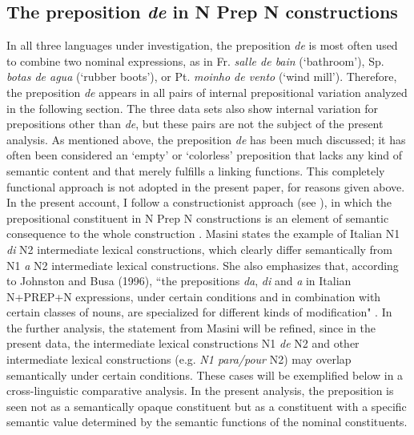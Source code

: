 \documentclass[output=paper]{langsci/langscibook}
\begin{document}
\subsection{The preposition \textit{de} in N Prep N constructions}
In all three languages under investigation, the preposition \textit{de} is most often used to combine two nominal expressions, as in Fr. \textit{salle de bain}  (`bathroom'), Sp. \textit{botas de agua} (`rubber boots'), or Pt. \textit{moinho de vento} (`wind mill'). Therefore, the preposition \textit{de} appears in all pairs of internal prepositional variation analyzed in the following section. The three data sets also show internal variation for prepositions other than \textit{de}, but these pairs are not the subject of the present analysis. As mentioned above, the preposition \textit{de} has been much discussed; it has often been considered an `empty' or `colorless' preposition that lacks any kind of semantic content and that merely fulfills a linking functions. This completely functional approach is not adopted in the present paper, for reasons given above.
In the present account, I follow a constructionist approach (see \citealt{Masini:2009}), in which the prepositional constituent in N Prep N constructions is an element of semantic consequence to the whole construction \citep[262]{Masini:2009}. Masini states the example of Italian N1 \textit{di} N2 intermediate lexical constructions, which clearly differ semantically from N1 \textit{a} N2 intermediate lexical constructions. She also emphasizes that, according to Johnston and Busa (1996), ``the prepositions \textit{da}, \textit{di} and \textit{a} in Italian N+PREP+N expressions, under certain conditions and in combination with certain classes of nouns, are specialized for different kinds of modification" \citep[262]{Masini:2009}. In the further analysis, the statement from Masini will be refined, since in the present data, the intermediate lexical constructions N1 \textit{de} N2 and other intermediate lexical constructions (e.g. \textit{N1 para/pour} N2) may overlap semantically under certain conditions. These cases will be exemplified below in a cross-linguistic comparative analysis. In the present analysis, the preposition is seen not as a semantically opaque constituent but as a constituent with a specific semantic value determined by the semantic functions of the nominal constituents.\\
\end{document}
